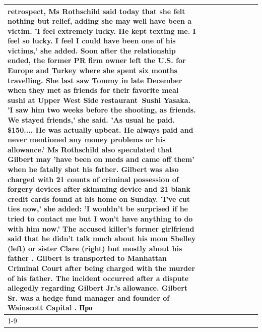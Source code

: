 \begin{table}[H]
\begin{tabular}{lllrlllll}
retrospect, Ms Rothschild said today that she felt nothing but relief, adding she may well have been a victim. 'I feel extremely lucky. He kept texting me. I feel so lucky. I feel I could have been one of his victims,' she added. Soon after the relationship ended, the former PR firm owner left the U.S. for Europe and Turkey where she spent six months  travelling. She last saw Tommy in late December when they met as friends for their favorite meal sushi at Upper West Side restaurant Sushi Yasaka. 'I saw him two weeks before the shooting, as friends. We stayed friends,' she said. 'As usual he paid. \$150.... He was actually upbeat. He always paid and never mentioned any money problems or his allowance.' Ms Rothschild also speculated that Gilbert may 'have been on meds and came off them' when he fatally shot his father. Gilbert was also charged with 21 counts of criminal possession of forgery devices after skimming device and 21 blank credit cards found at his home on Sunday. 'I've cut ties now,' she added: 'I wouldn’t be surprised if he tried to contact me but I won’t have anything to do with him now.' The accused killer's former girlfriend said that he didn't talk much about his mom Shelley (left) or sister Clare (right) but mostly about his father . Gilbert is transported to Manhattan Criminal Court  after being charged with the murder of his father. The incident occurred after a dispute allegedly regarding Gilbert Jr.'s allowance. Gilbert Sr. was a hedge fund manager and founder of Wainscott Capital . Про \\
\cline{1-9}

\end{tabular}
\end{table}
